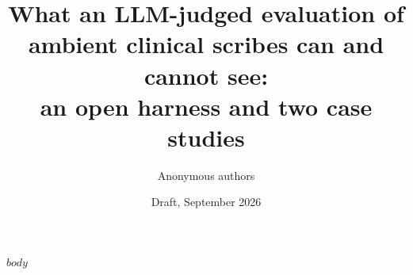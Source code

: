 \documentclass[11pt]{article}
\title{What an LLM-judged evaluation of ambient clinical scribes can and cannot see:\\ an open harness and two case studies}
\author{Anonymous authors}
\date{Draft, September 2026}
\begin{document}
\maketitle
$body$
\end{document}
